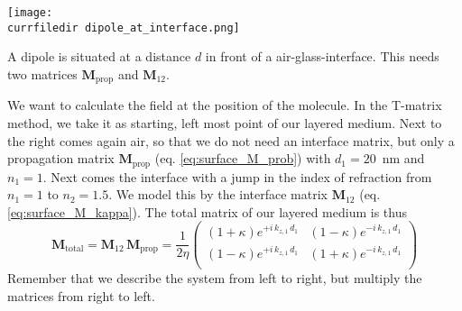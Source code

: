 \begin{marginfigure}
  \texttt{[image: \\currfiledir dipole\_at\_interface.png]}
  \caption{A dipole is situated at a distance $d$ in front of a air-glass-interface. This needs two matrices  $\mathbf{M}_\text{prop}$ and $\mathbf{M}_{12}$. }
\end{marginfigure}

We want to calculate the field at the position of the molecule. In the T-matrix method, we take it as starting, left most point of our layered medium. Next to the right comes again air, so that we do not need an interface matrix, but only a propagation matrix $\mathbf{M}_\text{prop}$ (eq. 
\ref{eq:surface_M_prob})  with $d_1 =20$~nm and $n_1 = 1$. Next comes the interface with a jump in the index of refraction from  $n_1 = 1$ to  $n_2 = 1.5$. We model this by the interface matrix $\mathbf{M}_{12}$ (eq.  \ref{eq:surface_M_kappa}). The total matrix of our layered medium is thus
\begin{equation}
\mathbf{M}_\text{total} = \mathbf{M}_{12} \,  \mathbf{M}_\text{prop} = 
\frac{ 1}{2 \eta }
\begin{pmatrix}
(1 + \kappa)  e^{+i \, k_{z,1} \, d_1 }  & (1  -\kappa) e^{-i \, k_{z,1} \, d_1 }  \\ 
( 1  - \kappa ) e^{+i \, k_{z,1} \, d_1 }  & (1 + \kappa) e^{-i \, k_{z,1} \, d_1 }  \\
\end{pmatrix}
\end{equation}
Remember that we describe the system from left to right, but multiply the matrices from right to left.

